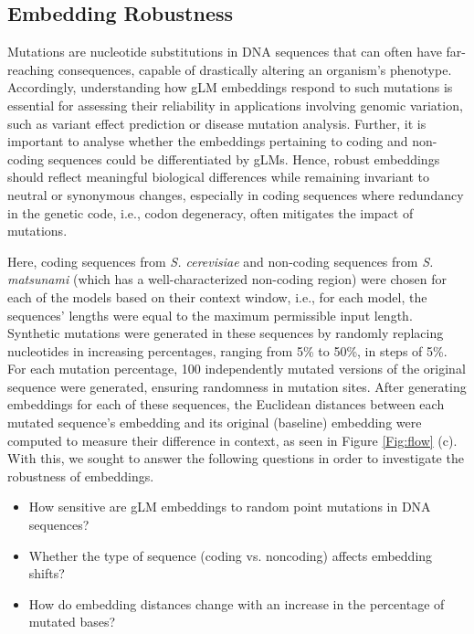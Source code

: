 \documentclass{ifacconf}
\begin{document}
\subsection{Embedding Robustness}%
Mutations are nucleotide substitutions in DNA sequences that can often have far-reaching consequences, capable of drastically altering an organism’s phenotype. Accordingly, understanding how gLM embeddings respond to such mutations is essential for assessing their reliability in applications involving genomic variation, such as variant effect prediction or disease mutation analysis. Further, it is important to analyse whether the embeddings pertaining to coding and non-coding sequences could be differentiated by gLMs. Hence, robust embeddings should reflect meaningful biological differences while remaining invariant to neutral or synonymous changes, especially in coding sequences where redundancy in the genetic code, i.e., codon degeneracy, often mitigates the impact of mutations. 

Here, coding sequences from {\em S. cerevisiae} and non-coding sequences from \textit{S. matsunami} (which has a well-characterized non-coding region) were chosen for each of the models based on their context window, i.e., for each model, the sequences’ lengths were equal to the maximum permissible input length. Synthetic mutations were generated in these sequences by randomly replacing nucleotides in increasing percentages, ranging from 5\% to 50\%, in steps of 5\%. For each mutation percentage,  100 independently mutated versions of the original sequence were generated, ensuring randomness in mutation sites. After generating embeddings for each of these sequences, the Euclidean distances between each mutated sequence’s embedding and its original (baseline) embedding were computed to measure their difference in context, as seen in Figure \ref{Fig:flow} (c). With this, we sought to answer
the following questions in order to investigate the robustness of embeddings.

\begin{itemize}[noitemsep,nolistsep]
    \item How sensitive are gLM embeddings to random point mutations in DNA sequences?
    \item Whether the type of sequence (coding vs. noncoding) affects embedding shifts?
    \item How do embedding distances change with an increase in the percentage of mutated bases?
\end{itemize}
\end{document}
